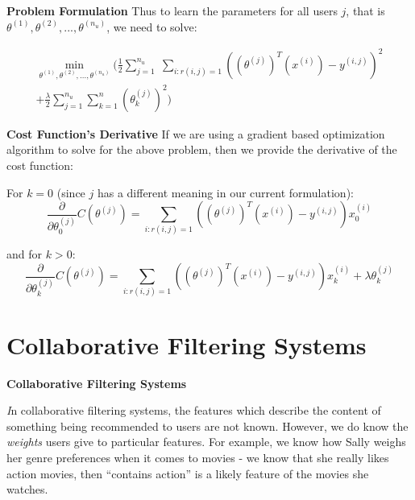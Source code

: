 \documentclass[xcolor=dvipsnames]{beamer}
\begin{document}
\begin{frame}
{\bf Problem Formulation}
Thus to learn the parameters for all users $j$, that is $\theta^{(1)}, \theta^{(2)}, ..., \theta^{(n_u)}$, we need to solve:\vfill\pause

\begin{eqnarray*}
\min_{\theta^{(1)}, \theta^{(2)}, ..., \theta^{(n_u)}} \Bigg( \frac{1}{2} \sum_{j=1}^{n_u}\;\sum_{i:r(i,j)=1}((\theta^{(j)})^T(x^{(i)}) - y^{(i,j)})^2 \\ 
+ \frac{\lambda}{2}\sum_{j=1}^{n_u}\sum_{k=1}^n(\theta^{(j)}_k)^2 \Bigg)
\end{eqnarray*}

\end{frame}

\begin{frame}
{\bf Cost Function's Derivative}
If we are using a gradient based optimization algorithm to solve for the above problem, then we provide the derivative of the cost function:
\vfill\pause

For $k=0$ (since $j$ has a different meaning in our current formulation):
\[
\frac{\partial}{\partial \theta^{(j)}_0}C(\theta^{(j)}) = \sum_{i:r(i,j)=1}((\theta^{(j)})^T(x^{(i)}) - y^{(i,j)})x^{(i)}_0
\]
\vfill\pause

and for $k > 0$:
\[
\frac{\partial}{\partial \theta^{(j)}_k}C(\theta^{(j)}) = \sum_{i:r(i,j)=1}((\theta^{(j)})^T(x^{(i)}) - y^{(i,j)})x^{(i)}_k + \lambda\theta^{(j)}_k
\]
\end{frame}

\section{Collaborative Filtering Systems}
\begin{frame}
{\bf Collaborative Filtering Systems}

{\it\huge I}n collaborative filtering systems, the features which describe the content of something being recommended to users are not known. However, we do know the \emph{weights} users give to particular features. \vfill\pause For example, we know how Sally weighs her genre preferences when it comes to movies - we know that she really likes action movies, then ``contains action'' is a likely feature of the movies she watches.\\
\end{frame}
\end{document}

